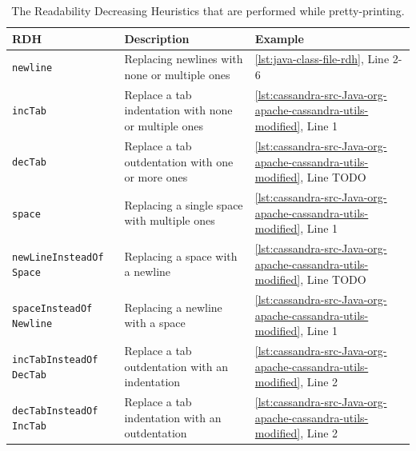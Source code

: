 \documentclass[%
class=scrreprt,
chapterprefix=false,%
open=right,%
twoside=false,%
paper=a4,%
logofile={Logo\_zentral\_farbig\_EN.png},%
thesistype=master,%
UKenglish,%
]{se2thesis}
\theoremstyle{definition}
\begin{document}
\begin{table}[p]
		\begin{subtable}{\textwidth}
			\centering
			\caption{The Readability Decreasing Heuristics that are performed while pretty-printing.}
			\vspace{8pt}
			\label{tab:code-rdhs}
			\begin{tabular}{|p{}|p{}|p{}|}
				\hline
				\textbf{RDH} & \textbf{Description} & \textbf{Example} \\
				\hline
				\texttt{newline} & Replacing newlines with none or multiple ones & \autoref{lst:java-class-file-rdh}, Line 2-6 \\
				\hline
				\texttt{incTab} & Replace a tab indentation with none or multiple ones & \autoref{lst:cassandra-src-Java-org-apache-cassandra-utils-modified}, Line 1 \\
				\hline
				\texttt{decTab} & Replace a tab outdentation with one or more ones & \autoref{lst:cassandra-src-Java-org-apache-cassandra-utils-modified}, Line TODO \\
				\hline
				\texttt{space} & Replacing a single space with multiple ones & \autoref{lst:cassandra-src-Java-org-apache-cassandra-utils-modified}, Line 1 \\
				\hline
				\texttt{newLineInsteadOf Space} & Replacing a space with a newline & \autoref{lst:cassandra-src-Java-org-apache-cassandra-utils-modified}, Line TODO \\
				\hline
				\texttt{spaceInsteadOf Newline} & Replacing a newline with a space & \autoref{lst:cassandra-src-Java-org-apache-cassandra-utils-modified}, Line 1 \\
				\hline
				\texttt{incTabInsteadOf DecTab} & Replace a tab outdentation with an indentation & \autoref{lst:cassandra-src-Java-org-apache-cassandra-utils-modified}, Line 2 \\
				\hline
				\texttt{decTabInsteadOf IncTab} & Replace a tab indentation with an outdentation & \autoref{lst:cassandra-src-Java-org-apache-cassandra-utils-modified}, Line 2 \\
				\hline
			\end{tabular}
		\end{subtable}
		

	\end{table}
	
\end{document}
